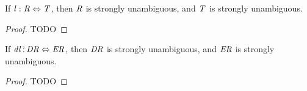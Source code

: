 \documentclass[numbers,10pt,preprint\ifanon ,nocopyrightspace\fi]{sigplanconf}
\begin{document}
\begin{lemma}
  \label{lem:strong-unambig-lens-types}
  If $\mathit{l} : \mathit{R} \Leftrightarrow \mathit{T}$, then $\mathit{R}$ is strongly
  unambiguous, and $\mathit{T}$ is strongly unambiguous.
\end{lemma}
\begin{proof}
  TODO
\end{proof}

\begin{lemma}
  \label{lem:strong-unambig-dnf-lens-types}
  If $\mathit{dl} \,\tilde{:}\, \mathit{DR} \Leftrightarrow \mathit{ER}$,
  then $\mathit{DR}$ is strongly unambiguous, and $\mathit{ER}$ is strongly
  unambiguous.
\end{lemma}
\begin{proof}
  TODO
\end{proof}
\end{document}
